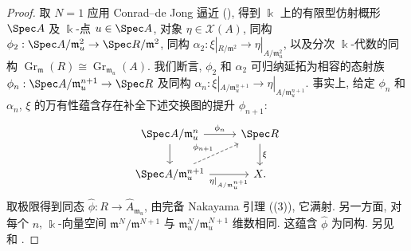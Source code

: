 \begin{proof}
取 $N=1$ 应用 Conrad--de Jong 逼近 (), 得到 $\Bbbk$ 上的有限型仿射概形 $\Spec A$ 及 $\Bbbk$-点 $u\in\Spec A$, 对象 $\eta\in\mathcal X(A)$, 同构 $\phi_2:\Spec A/\mathfrak m_u^2\to\Spec R/\mathfrak m^2$, 同构 $\alpha_2:\xi|_{R/\mathfrak m^2}\to\eta|_{A/\mathfrak m_u^2}$, 以及分次 $\Bbbk$-代数的同构 $\operatorname{Gr}_{\mathfrak m}(R)\cong\operatorname{Gr}_{\mathfrak m_u}(A)$. 我们断言, $\phi_2$ 和 $\alpha_2$ 可归纳延拓为相容的态射族 $\phi_n:\Spec A/\mathfrak m_u^{n+1}\to\Spec R$ 及同构 $\alpha_n:\xi|_{A/\mathfrak m_u^{n+1}}\to\eta|_{A/\mathfrak m_u^{n+1}}$. 事实上, 给定 $\phi_n$ 和 $\alpha_n$, $\xi$ 的万有性蕴含存在补全下述交换图的提升 $\phi_{n+1}$:
\[
\begin{tikzcd}
\Spec A/\mathfrak m_u^n\arrow[r,"\phi_n"]\arrow[d]&\Spec R\arrow[d,"\xi"]\\
\Spec A/\mathfrak m_u^{n+1}\arrow[r,"\eta|_{A/\mathfrak m_u^{n+1}}"']\arrow[ur,dashed,"\phi_{n+1}"]&\mathcal X.
\end{tikzcd}
\]
取极限得到同态 $\widehat\phi:R\to\widehat A_{\mathfrak m_u}$, 由完备 Nakayama 引理 ((3)), 它满射. 另一方面, 对每个 $n$, $\Bbbk$-向量空间 $\mathfrak m^N/\mathfrak m^{N+1}$ 与 $\mathfrak m_u^N/\mathfrak m_u^{N+1}$ 维数相同. 这蕴含 $\widehat\phi$ 为同构. 另见 \cite[定理 $1.6$]{Art69b} 和 \cite[\S$4$]{CdJ02}.
\end{proof}
